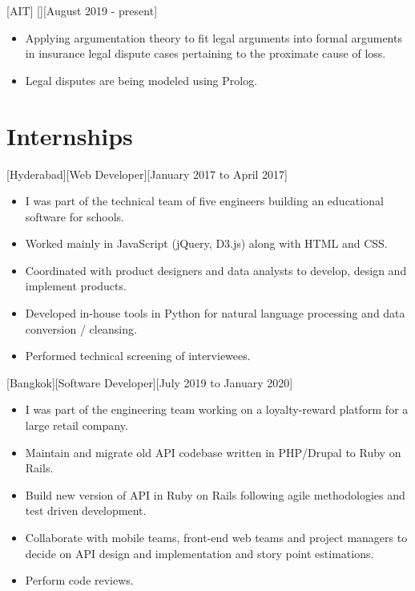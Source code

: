 \documentclass{article}
\begin{document}
[AIT]
[][August 2019 - present]
\begin{itemize}
    \item Applying argumentation theory to fit legal arguments into formal arguments in insurance legal dispute cases pertaining to the proximate cause of loss.
    \item Legal disputes are being modeled using Prolog.
\end{itemize}

\newpage
 
\section{Internships}
[Hyderabad][Web Developer][January 2017 to April 2017]

\begin{itemize}
    \item I was part of the technical team of five engineers building an educational software for schools.
    \item Worked mainly in JavaScript (jQuery, D3.js) along with HTML and CSS.
    \item Coordinated with product designers and data analysts to develop, design and implement products.
    \item Developed in-house tools in Python for natural language processing and data conversion / cleansing.
    \item Performed technical screening of interviewees.
\end{itemize}

[Bangkok][Software Developer][July 2019 to January 2020]

\begin{itemize}
    \item I was part of the engineering team working on a loyalty-reward platform for a large retail company.
    \item Maintain and migrate old API codebase written in PHP/Drupal to Ruby on Rails.
    \item Build new version of API in Ruby on Rails following agile methodologies and test driven development.
    \item Collaborate with mobile teams, front-end web teams and project managers to decide on API design and implementation and story point estimations.
    \item Perform code reviews.
\end{itemize}
\end{document}
